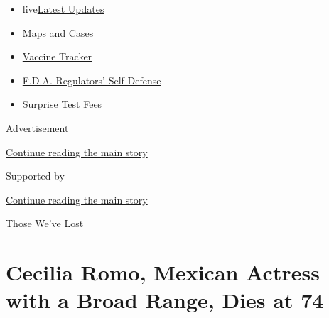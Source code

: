 \begin{itemize}
\tightlist
\item
  live\href{https://www.nytimes3xbfgragh.onion/2020/09/12/world/covid-19-coronavirus.html?name=promo-coronavirus-obits\&region=TOP_BANNER\&block=storyline_menu_recirc\&action=click\&pgtype=Article\&impression_id=bc6795a0-f52d-11ea-9ef0-65b6da73d0be\&variant=undefined}{Latest
  Updates}
\item
  \href{https://www.nytimes3xbfgragh.onion/interactive/2020/us/coronavirus-us-cases.html?name=promo-coronavirus-obits\&region=TOP_BANNER\&block=storyline_menu_recirc\&action=click\&pgtype=Article\&impression_id=bc6795a1-f52d-11ea-9ef0-65b6da73d0be\&variant=undefined}{Maps
  and Cases}
\item
  \href{https://www.nytimes3xbfgragh.onion/interactive/2020/science/coronavirus-vaccine-tracker.html?name=promo-coronavirus-obits\&region=TOP_BANNER\&block=storyline_menu_recirc\&action=click\&pgtype=Article\&impression_id=bc6795a2-f52d-11ea-9ef0-65b6da73d0be\&variant=undefined}{Vaccine
  Tracker}
\item
  \href{https://www.nytimes3xbfgragh.onion/2020/09/10/us/politics/fda-coronavirus-vaccine.html?name=promo-coronavirus-obits\&region=TOP_BANNER\&block=storyline_menu_recirc\&action=click\&pgtype=Article\&impression_id=bc6795a3-f52d-11ea-9ef0-65b6da73d0be\&variant=undefined}{F.D.A.
  Regulators' Self-Defense}
\item
  \href{https://www.nytimes3xbfgragh.onion/2020/09/09/upshot/coronavirus-surprise-test-fees.html?name=promo-coronavirus-obits\&region=TOP_BANNER\&block=storyline_menu_recirc\&action=click\&pgtype=Article\&impression_id=bc6795a4-f52d-11ea-9ef0-65b6da73d0be\&variant=undefined}{Surprise
  Test Fees}
\end{itemize}

Advertisement

\protect\hyperlink{after-top}{Continue reading the main story}

Supported by

\protect\hyperlink{after-sponsor}{Continue reading the main story}

Those We've Lost

\hypertarget{cecilia-romo-mexican-actress-with-a-broad-range-dies-at-74}{%
\section{Cecilia Romo, Mexican Actress with a Broad Range, Dies at
74}\label{cecilia-romo-mexican-actress-with-a-broad-range-dies-at-74}}


